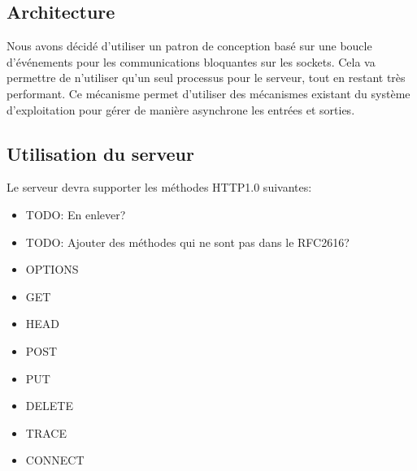 \documentclass{scrreprt}
\begin{document}
\subsection{Architecture}
Nous avons décidé d'utiliser un patron de conception basé sur
une boucle d’événements pour les communications bloquantes sur les sockets. Cela va 
permettre de n'utiliser qu'un seul processus pour le serveur, tout en restant très performant.
Ce mécanisme permet d'utiliser des mécanismes existant du système d'exploitation
pour gérer de manière asynchrone les entrées et sorties\cite{c10k}.
\subsection{Utilisation du serveur}
Le serveur devra supporter les méthodes HTTP1.0 suivantes:\\
\begin{itemize}
 \item TODO: En enlever?
 \item TODO: Ajouter des méthodes qui ne sont pas dans le RFC2616?
 \item OPTIONS
 \item GET
 \item HEAD
 \item POST
 \item PUT
 \item DELETE
 \item TRACE
 \item CONNECT
 \\
 
\end{itemize}
\end{document}

